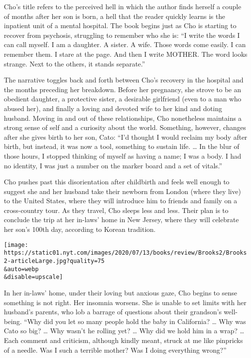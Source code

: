 Cho's title refers to the perceived hell in which the author finds
herself a couple of months after her son is born, a hell that the reader
quickly learns is the inpatient unit of a mental hospital. The book
begins just as Cho is starting to recover from psychosis, struggling to
remember who she is: ``I write the words I can call myself. I am a
daughter. A sister. A wife. Those words come easily. I can remember
them. I stare at the page. And then I write MOTHER. The word looks
strange. Next to the others, it stands separate.''

The narrative toggles back and forth between Cho's recovery in the
hospital and the months preceding her breakdown. Before her pregnancy,
she strove to be an obedient daughter, a protective sister, a desirable
girlfriend (even to a man who abused her), and finally a loving and
devoted wife to her kind and doting husband. Moving in and out of these
relationships, Cho nonetheless maintains a strong sense of self and a
curiosity about the world. Something, however, changes after she gives
birth to her son, Cato: ``I'd thought I would reclaim my body after
birth, but instead, it was now a tool, something to sustain life.
\ldots{} In the blur of those hours, I stopped thinking of myself as
having a name; I was a body. I had no identity, I was just a number on
the marker board and a set of vitals.''

Cho pushes past this disorientation after childbirth and feels well
enough to suggest she and her husband take their newborn from London
(where they live) to the United States, where they will introduce him to
friends and family on a cross-country tour. As they travel, Cho sleeps
less and less. Their plan is to conclude the trip at her in-laws' home
in New Jersey, where they will celebrate her son's 100th day, according
to Korean tradition.

\texttt{[image: https://static01.nyt.com/images/2020/07/13/books/review/Brooks2/Brooks2-articleLarge.jpg?quality=75\\\&auto=webp\\\&disable=upscale]}

In her in-laws' home, under their loving but anxious gaze, Cho begins to
sense something is not right. Her insomnia worsens. She is unable to set
limits with her husband's parents, who lob a barrage of questions about
their grandson's well-being. ``Why did you let so many people hold the
baby in California? \ldots{} Why was Cato so big? \ldots{} Why wasn't he
rolling yet? \ldots{} Why did we hold him in a wrap? \ldots{} Each
comment and criticism, although kindly meant, struck at me like
pinpricks of a needle. Was I such a terrible mother? Was I doing
everything wrong?''

